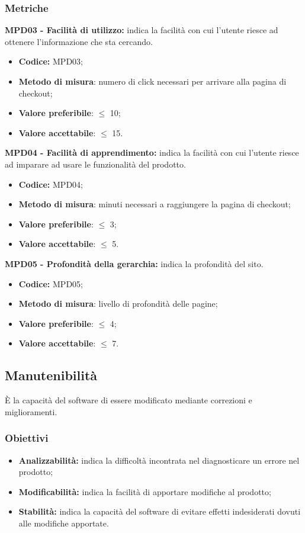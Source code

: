 \subsubsection{Metriche}
\textbf{MPD03 - Facilità di utilizzo:} indica la facilità con cui l'utente riesce ad ottenere l'informazione che sta cercando.
\begin{itemize}
    \item \textbf{Codice:} MPD03;
    \item \textbf{Metodo di misura}: numero di click necessari per arrivare alla pagina di checkout;
    \item \textbf{Valore preferibile}: $\leq$ 10;
    \item \textbf{Valore accettabile}: $\leq$ 15.
\end{itemize}
\textbf{MPD04 - Facilità di apprendimento:} indica la facilità con cui l'utente riesce ad imparare ad usare le funzionalità del prodotto.
\begin{itemize}
    \item \textbf{Codice:} MPD04;
    \item \textbf{Metodo di misura}: minuti necessari a raggiungere la pagina di checkout;
    \item \textbf{Valore preferibile}: $\leq$ 3;
    \item \textbf{Valore accettabile}: $\leq$ 5.
\end{itemize}
\textbf{MPD05 - Profondità della gerarchia:} indica la profondità del sito.
\begin{itemize}
    \item \textbf{Codice:} MPD05;
    \item \textbf{Metodo di misura}: livello di profondità delle pagine;
    \item \textbf{Valore preferibile}: $\leq$ 4;
    \item \textbf{Valore accettabile}: $\leq$ 7.
\end{itemize}
\subsection{Manutenibilità}
È la capacità del software di essere modificato mediante correzioni e miglioramenti.
\subsubsection{Obiettivi}
\begin{itemize}
    \item \textbf{Analizzabilità:} indica la difficoltà incontrata nel diagnosticare un errore nel prodotto;
    \item \textbf{Modificabilità:} indica la facilità di apportare modifiche al prodotto;
    \item \textbf{Stabilità:} indica la capacità del software di evitare effetti indesiderati dovuti alle modifiche apportate.
\end{itemize}
